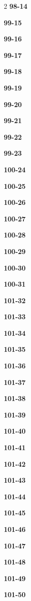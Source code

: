 \documentclass[10pt,a4paper]{article}
\begin{document}
\begin{multicols}{2}
\noindent\textbf{98-14}\ \par
\noindent\textbf{99-15}\ \par
\noindent\textbf{99-16}\ \par
\noindent\textbf{99-17}\ \par
\noindent\textbf{99-18}\ \par
\noindent\textbf{99-19}\ \par
\noindent\textbf{99-20}\ \par
\noindent\textbf{99-21}\ \par
\noindent\textbf{99-22}\ \par
\noindent\textbf{99-23}\ \par
\noindent\textbf{100-24}\ \par
\noindent\textbf{100-25}\ \par
\noindent\textbf{100-26}\ \par
\noindent\textbf{100-27}\ \par
\noindent\textbf{100-28}\ \par
\noindent\textbf{100-29}\ \par
\noindent\textbf{100-30}\ \par
\noindent\textbf{100-31}\ \par
\noindent\textbf{101-32}\ \par
\noindent\textbf{101-33}\ \par
\noindent\textbf{101-34}\ \par
\noindent\textbf{101-35}\ \par
\noindent\textbf{101-36}\ \par
\noindent\textbf{101-37}\ \par
\noindent\textbf{101-38}\ \par
\noindent\textbf{101-39}\ \par
\noindent\textbf{101-40}\ \par
\noindent\textbf{101-41}\ \par
\noindent\textbf{101-42}\ \par
\noindent\textbf{101-43}\ \par
\noindent\textbf{101-44}\ \par
\noindent\textbf{101-45}\ \par
\noindent\textbf{101-46}\ \par
\noindent\textbf{101-47}\ \par
\noindent\textbf{101-48}\ \par
\noindent\textbf{101-49}\ \par
\noindent\textbf{101-50}\ \par

\end{multicols}
\end{document}
